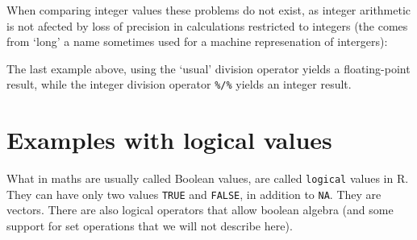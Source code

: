 \documentclass[paper=a4,10pt,div=17,headsepline,BCOR=12mm,twoside,open=right]{scrbook}\usepackage{knitr}
\begin{document}
When comparing integer values these problems do not exist, as integer arithmetic is not afected by loss of precision in  calculations restricted to integers (the  comes from `long' a name sometimes used for a machine represenation of intergers):

\begin{knitrout}\footnotesize
{}\color{fgcolor}
\end{knitrout}

The last example above, using the `usual' division operator yields a floating-point  result, while the integer division operator \verb|%/%| yields an integer result.

\section{Examples with logical values}

What in maths are usually called Boolean values, are called \texttt{logical} values in R. They can have only two values \texttt{TRUE} and \texttt{FALSE}, in addition to \texttt{NA}. They are vectors. There are also logical operators that allow boolean algebra (and some support for set operations that we will not describe here).
\end{document}
